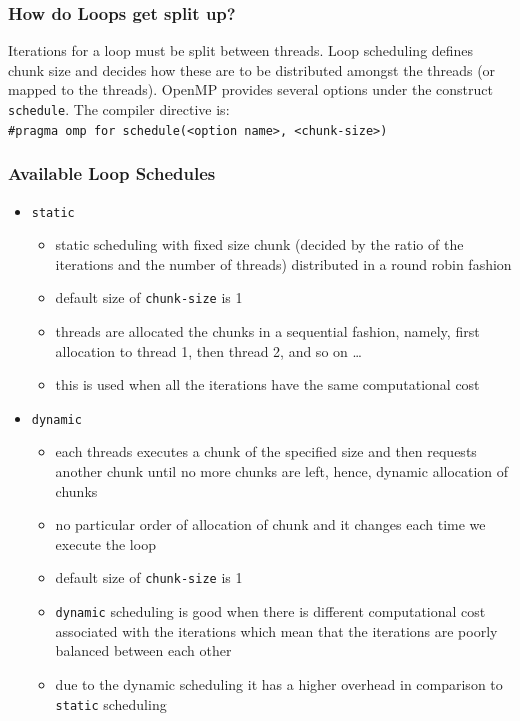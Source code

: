 \documentclass[12pt, a4paper]{report}
\begin{document}
\subsubsection*{How do Loops get split up?}
Iterations for a loop must be split between threads. Loop scheduling defines chunk size and decides how these are to be distributed amongst
the threads (or mapped to the threads). OpenMP provides several options under the construct {\texttt{schedule}}. The compiler directive is:\\
\verb$#pragma omp for schedule(<option name>, <chunk-size>)$

\subsubsection*{Available Loop Schedules}
\begin{itemize}
    \item {\texttt{static}}
    \begin{itemize}
        \item static scheduling with fixed size chunk (decided by the ratio of the iterations and the number of threads) distributed in a
              round robin fashion
        \item default size of {\texttt{chunk-size}} is 1
        \item threads are allocated the chunks in a sequential fashion, namely, first allocation to thread 1, then thread 2, and so on \dots
        \item this is used when all the iterations have the same computational cost
    \end{itemize}
    \item {\texttt{dynamic}}
    \begin{itemize}
        \item each threads executes a chunk of the specified size and then requests another chunk until no more chunks are left, hence, 
              dynamic allocation of chunks
        \item no particular order of allocation of chunk and it changes each time we execute the loop
        \item default size of {\texttt{chunk-size}} is 1
        \item {\texttt{dynamic}} scheduling is good when there is different computational cost associated with the iterations which mean that
              the iterations are poorly balanced between each other
        \item due to the dynamic scheduling it has a higher overhead in comparison to {\texttt{static}} scheduling

\end{itemize}
\end{itemize}
\end{document}
